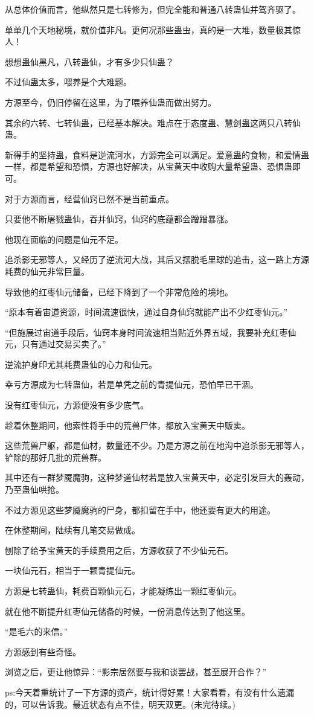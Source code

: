 \begin{this_body}
从总体价值而言，他纵然只是七转修为，但完全能和普通八转蛊仙并驾齐驱了。

单单几个天地秘境，就价值非凡。更何况那些蛊虫，真的是一大堆，数量极其惊人！

想想蛊仙黑凡，八转蛊仙，才有多少只仙蛊？

不过仙蛊太多，喂养是个大难题。

方源至今，仍旧停留在这里，为了喂养仙蛊而做出努力。

其余的六转、七转仙蛊，已经基本解决。难点在于态度蛊、慧剑蛊这两只八转仙蛊。

新得手的坚持蛊，食料是逆流河水，方源完全可以满足。爱意蛊的食物，和爱情蛊一样，都是希望和恐惧，方源也好解决，从宝黄天中收购大量希望蛊、恐惧蛊即可。

对于方源而言，经营仙窍已然不是当前重点。

只要他不断屠戮蛊仙，吞并仙窍，仙窍的底蕴都会蹭蹭暴涨。

他现在面临的问题是仙元不足。

追杀影无邪等人，又经历了逆流河大战，其后又摆脱毛里球的追击，这一路上方源耗费的仙元非常巨量。

导致他的红枣仙元储备，已经下降到了一个非常危险的境地。

“原本有着宙道资源，时间流速很快，通过自身仙窍就能产出不少红枣仙元。”

“但施展过宙道手段后，仙窍本身时间流速相当贴近外界五域，我要补充红枣仙元，只有通过交易买卖了。”

逆流护身印尤其耗费蛊仙的心力和仙元。

幸亏方源成为七转蛊仙，若是单凭之前的青提仙元，恐怕早已干涸。

没有红枣仙元，方源便没有多少底气。

趁着休整期间，他索性将手中的荒兽尸体，都放入宝黄天中贩卖。

这些荒兽尸躯，都是仙材，数量还不少。乃是方源之前在地沟中追杀影无邪等人，铲除的那好几批的荒兽群。

其中还有一群梦魇魔驹，这种梦道仙材若是放入宝黄天中，必定引发巨大的轰动，乃至蛊仙哄抢。

不过方源见这些梦魇魔驹的尸身，都扣留在手中，他还要有更大的用途。

在休整期间，陆续有几笔交易做成。

刨除了给予宝黄天的手续费用之后，方源收获了不少仙元石。

一块仙元石，相当于一颗青提仙元。

方源是七转蛊仙，耗费百颗仙元石，才能凝练出一颗红枣仙元。

就在他不断提升红枣仙元储备的时候，一份消息传达到了他这里。

“是毛六的来信。”

方源感到有些奇怪。

浏览之后，更让他惊异：“影宗居然要与我和谈罢战，甚至展开合作？”

ps:今天着重统计了一下方源的资产，统计得好累！大家看看，有没有什么遗漏的，可以告诉我。最近状态有点不佳，明天双更。(未完待续。)

\end{this_body}

